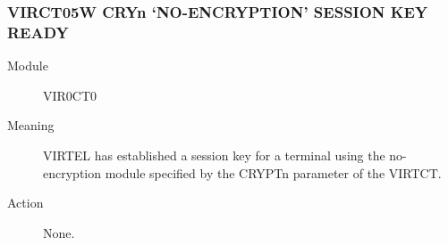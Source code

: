 \documentclass[letterpaper,10pt,english]{sphinxmanual}
\begin{document}
\subsubsection{VIRCT05W CRYn ‘NO-ENCRYPTION’ SESSION KEY READY}
\label{\detokenize{messages:virct05w-cryn-no-encryption-session-key-ready}}\begin{description}
\item[{Module}] \leavevmode
VIR0CT0

\item[{Meaning}] \leavevmode
VIRTEL has established a session key for a terminal using the no-encryption module specified by the CRYPTn parameter of the VIRTCT.

\item[{Action}] \leavevmode
None.

\end{description}
\end{document}
